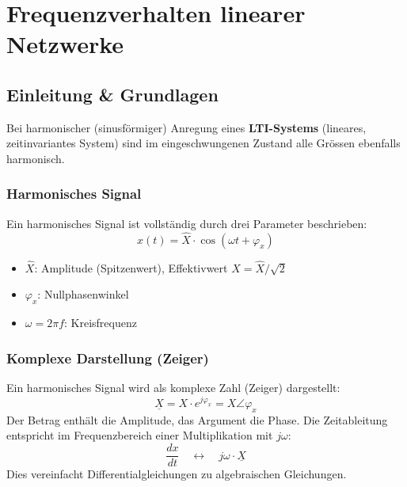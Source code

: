 \documentclass[a4paper,12pt]{article}
\begin{document}
	\section{Frequenzverhalten linearer Netzwerke}
	
	
	\subsection{Einleitung \& Grundlagen}
	
	Bei harmonischer (sinusförmiger) Anregung eines \textbf{LTI-Systems} (lineares,
	zeitinvariantes System) sind im eingeschwungenen Zustand alle Grössen ebenfalls
	harmonisch.
	
	\subsubsection*{Harmonisches Signal}
	Ein harmonisches Signal ist vollständig durch drei Parameter beschrieben:
	\begin{equation}
		x(t) = \hat{X} \cdot \cos(\omega t + \varphi_x)
	\end{equation}
	\begin{itemize}
		\item $\hat{X}$: Amplitude (Spitzenwert), Effektivwert $X = \hat{X}/\sqrt{2}$
		\item $\varphi_x$: Nullphasenwinkel
		\item $\omega = 2\pi f$: Kreisfrequenz
	\end{itemize}
	
	\subsubsection*{Komplexe Darstellung (Zeiger)}
	Ein harmonisches Signal wird als komplexe Zahl (Zeiger) dargestellt:
	\begin{equation}
		\underline{X} = X \cdot e^{j\varphi_x} = X \angle \varphi_x
	\end{equation}
	Der Betrag enthält die Amplitude, das Argument die Phase.
	Die Zeitableitung entspricht im Frequenzbereich einer Multiplikation mit $j\omega$:
	\begin{equation}
		\frac{dx}{dt} \quad \longleftrightarrow \quad j\omega \cdot \underline{X}
	\end{equation}
	Dies vereinfacht Differentialgleichungen zu algebraischen Gleichungen.
	
\end{document}
